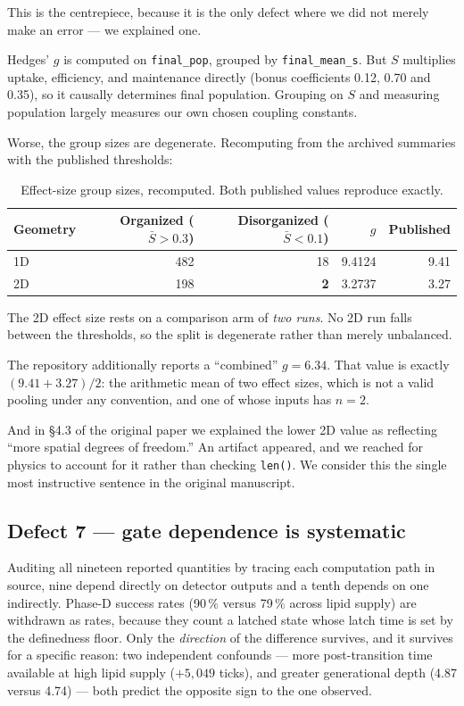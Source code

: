 \documentclass[11pt,letterpaper]{article}
\begin{document}
This is the centrepiece, because it is the only defect where we did not
merely make an error --- we explained one.

Hedges' $g$ is computed on \texttt{final\_pop}, grouped by
\texttt{final\_mean\_s}. But $S$ multiplies uptake, efficiency, and
maintenance directly (bonus coefficients 0.12, 0.70 and 0.35), so it
causally determines final population. Grouping on $S$ and measuring
population largely measures our own chosen coupling constants.

Worse, the group sizes are degenerate. Recomputing from the archived
summaries with the published thresholds:

\begin{table}[H]
\centering
\caption{Effect-size group sizes, recomputed. Both published values
reproduce exactly.}
\begin{tabular}{lrrrr}
\toprule
Geometry & Organized ($\bar S > 0.3$) & Disorganized ($\bar S < 0.1$)
& $g$ & Published \\
\midrule
1D & 482 & 18 & 9.4124 & 9.41 \\
2D & 198 & \textbf{2} & 3.2737 & 3.27 \\
\bottomrule
\end{tabular}
\end{table}

The 2D effect size rests on a comparison arm of \emph{two runs}. No 2D
run falls between the thresholds, so the split is degenerate rather than
merely unbalanced.

The repository additionally reports a ``combined'' $g = 6.34$. That
value is exactly $(9.41 + 3.27)/2$: the arithmetic mean of two effect
sizes, which is not a valid pooling under any convention, and one of
whose inputs has $n = 2$.

And in \S4.3 of the original paper we explained the lower 2D value as
reflecting ``more spatial degrees of freedom.'' An artifact appeared, and
we reached for physics to account for it rather than checking
\texttt{len()}. We consider this the single most instructive sentence in
the original manuscript.

\subsection{Defect 7 --- gate dependence is systematic}

Auditing all nineteen reported quantities by tracing each computation
path in source, nine depend directly on detector outputs and a tenth
depends on one indirectly. Phase-D success rates
(90\,\% versus 79\,\% across lipid supply) are withdrawn as rates,
because they count a latched state whose latch time is set by the
definedness floor. Only the \emph{direction} of the difference survives,
and it survives for a specific reason: two independent confounds --- more
post-transition time available at high lipid supply ($+5{,}049$ ticks),
and greater generational depth (4.87 versus 4.74) --- both predict the
opposite sign to the one observed.
\end{document}
